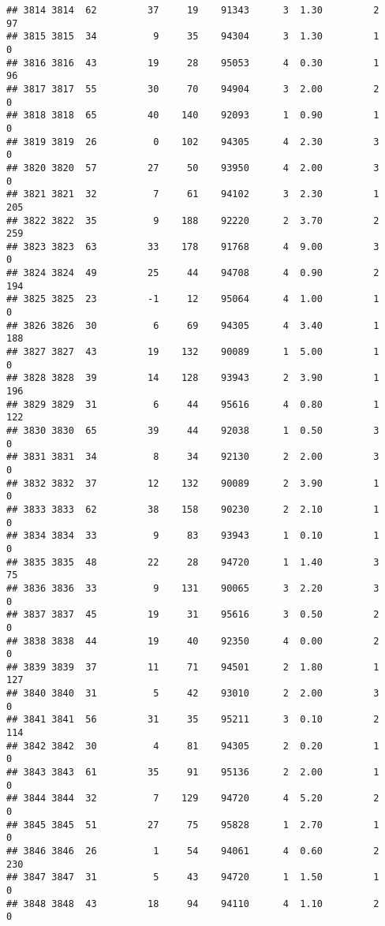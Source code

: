 \documentclass[
]{article}
\begin{document}
\begin{verbatim}
## 3814 3814  62         37     19    91343      3  1.30         2       97
## 3815 3815  34          9     35    94304      3  1.30         1        0
## 3816 3816  43         19     28    95053      4  0.30         1       96
## 3817 3817  55         30     70    94904      3  2.00         2        0
## 3818 3818  65         40    140    92093      1  0.90         1        0
## 3819 3819  26          0    102    94305      4  2.30         3        0
## 3820 3820  57         27     50    93950      4  2.00         3        0
## 3821 3821  32          7     61    94102      3  2.30         1      205
## 3822 3822  35          9    188    92220      2  3.70         2      259
## 3823 3823  63         33    178    91768      4  9.00         3        0
## 3824 3824  49         25     44    94708      4  0.90         2      194
## 3825 3825  23         -1     12    95064      4  1.00         1        0
## 3826 3826  30          6     69    94305      4  3.40         1      188
## 3827 3827  43         19    132    90089      1  5.00         1        0
## 3828 3828  39         14    128    93943      2  3.90         1      196
## 3829 3829  31          6     44    95616      4  0.80         1      122
## 3830 3830  65         39     44    92038      1  0.50         3        0
## 3831 3831  34          8     34    92130      2  2.00         3        0
## 3832 3832  37         12    132    90089      2  3.90         1        0
## 3833 3833  62         38    158    90230      2  2.10         1        0
## 3834 3834  33          9     83    93943      1  0.10         1        0
## 3835 3835  48         22     28    94720      1  1.40         3       75
## 3836 3836  33          9    131    90065      3  2.20         3        0
## 3837 3837  45         19     31    95616      3  0.50         2        0
## 3838 3838  44         19     40    92350      4  0.00         2        0
## 3839 3839  37         11     71    94501      2  1.80         1      127
## 3840 3840  31          5     42    93010      2  2.00         3        0
## 3841 3841  56         31     35    95211      3  0.10         2      114
## 3842 3842  30          4     81    94305      2  0.20         1        0
## 3843 3843  61         35     91    95136      2  2.00         1        0
## 3844 3844  32          7    129    94720      4  5.20         2        0
## 3845 3845  51         27     75    95828      1  2.70         1        0
## 3846 3846  26          1     54    94061      4  0.60         2      230
## 3847 3847  31          5     43    94720      1  1.50         1        0
## 3848 3848  43         18     94    94110      4  1.10         2        0

\end{verbatim}
\end{document}
